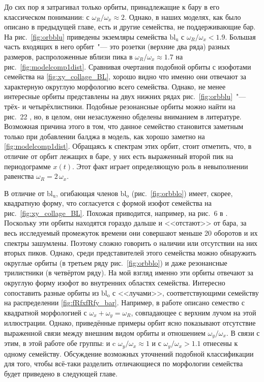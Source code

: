\documentclass[tikz]{trlnotes}
\begin{document}
До сих пор я затрагивал только орбиты, принадлежащие к бару в его классическом понимании: с $ω_R/ω_x \approx 2$.
Однако, в наших моделях, как было описано в предыдущей главе, есть и другие семейства, не поддерживающие бар.
На рис.~\ref{fig:orbblu} приведены экземляры семейства $\text{bl}_{\text{u}}$ с $ω_R/ω_x < 1.9$. Большая часть 
входящих в него орбит~"--- это розетки (верхние два ряда) разных размеров, 
распроложенные вблизи пика в $ω_R/ω_x \approx 1.7$ на рис.~\ref{fig:modelcomp1dist}.
Сравнивая очертания подобной орбиты с изофотами семейства на \ref{fig:xy_collage_BL}, хорошо видно что именно они отвечают
за характерную округлую морфологию всего семейства. Однако, не менее интересные орбиты представлены
на двух нижних рядах рис.~\ref{fig:orbblu}~"--- трёх- и четырёхлистники. Подобные резонансные орбиты можно
найти на рис.~22 \citet{voglis2007}, но, в целом, они незаслуженно обделены вниманием в литературе.
Возможная причина этого в том, что данное семейство становится заметным только при добавлении балджа в модель, как хорошо
заметно на \ref{fig:modelcomp1dist}.
Обращаясь к спектрам этих орбит, стоит отметить, что, в отличие от орбит лежащих в баре, у них есть
выраженный второй пик на периодограмме $x(t)$. Этот факт играет определяющую роль в невыполнении равенства $ω_R = 2\,ω_x$.

В отличие от $\text{bl}_{\text{u}}$, огибающая членов $\text{bl}_{\text{o}}$ (рис.~\ref{fig:orbblo})
имеет, скорее, квадратную форму, что согласуется с формой изофот семейства на рис.~\ref{fig:xy_collage_BL}. Похожая 
приводится, например, на рис.~6 в \cite{gajda2016}. Поскольку эти орбиты находятся
гораздо дальше и <<отстают>> от бара, за весь исследуемый промежуток времени они совершают меньше 20 оборотов и их спектры зашумлены. Поэтому
сложно говорить о наличии или отсутствии на них вторых пиков. Однако, среди представителей этого семейства можно обнаружить 
округлые орбиты (в третьем ряду рис.~\ref{fig:orbblo}) и даже резонансные трилистники (в четвёртом ряду). 
На мой взгляд именно эти орбиты отвечают за округлую форму изофот во внутренних областях семейства. 
Интересно сопоставить разные орбиты из $\text{bl}_\text{o}$ с <<лучами>>, соответствующими семейству на распределении \ref{fig:fRfxfRfy_bar}.
Например, в работе \cite{gajda2016} описано семество с квадратной морфологией с $ω_x + ω_y = ω_R$, совпадающее с верхним 
лучом на этой иллюстрации. Однако, приведённые примеры орбит ясно показывают отсутствие выраженной
связи между внешним видом орбиты и отношением $ω_y/ω_x$.
В связи с этим, в этой работе обе группы: и c $ω_y/ω_x \approx 1$ и с $ω_y/ω_x > 1.1$ отнесены к одному семейству. 
Обсуждение возможных уточнений подобной классификации для того, 
чтобы всё-таки разделить отличающиеся по морфологии семейства будет приведено в следующей главе.
\end{document}
